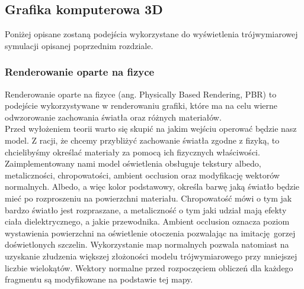\subsection{Grafika komputerowa 3D}

Poniżej opisane zostaną podejścia wykorzystane do wyświetlenia trójwymiarowej symulacji opisanej poprzednim rozdziale.

\subsubsection{Renderowanie oparte na fizyce}

Renderowanie oparte na fizyce (ang. Physically Based Rendering, PBR) to podejście wykorzystywane w renderowaniu grafiki, które ma na celu wierne odwzorowanie zachowania światła oraz różnych materiałów.
\\

Przed wyłożeniem teorii warto się skupić na jakim wejściu operować będzie nasz model. Z racji, że chcemy przybliżyć zachowanie światła zgodne z fizyką, to chcielibyśmy określać materiały za pomocą ich fizycznych właściwości. Zaimplementowany nami model oświetlenia obsługuje tekstury albedo, metaliczności, chropowatości, ambient occlusion oraz modyfikację wektorów normalnych.
Albedo, a więc kolor podstawowy, określa barwę jaką światło będzie mieć po rozproszeniu na powierzchni materiału. Chropowatość mówi o tym jak bardzo światło jest rozpraszane, a  metaliczność o tym jaki udział mają efekty ciała dielektrycznego, a jakie przewodnika. Ambient occlusion oznacza poziom wystawienia powierzchni na oświetlenie otoczenia pozwalając na imitację gorzej doświetlonych szczelin. Wykorzystanie map normalnych pozwala natomiast na uzyskanie złudzenia większej złożoności modelu trójwymiarowego przy mniejszej liczbie wielokątów. Wektory normalne przed rozpoczęciem obliczeń dla każdego fragmentu są modyfikowane na podstawie tej mapy.
\\

